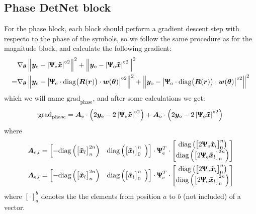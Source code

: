 \subsection{Phase DetNet block}

For the phase block, each block should perform a gradient descent step with respecto to the phase of the symbols, so we follow the same procedure as for the magnitude block, and calculate the following gradient:
 \begin{align}
	&\nabla_{\bm \theta}\left\lVert \bm y_\text{e} - \left|\bm{\Uppsi_\text{e}\tilde{x} } \right|^{\circ2}\right\rVert^2+\left\lVert \bm y_\text{o} - \left|\bm{\Uppsi_\text{o}\tilde{x} } \right|^{\circ2}\right\rVert^2\\
	=&\nabla_{\bm \theta}\left\lVert \bm y_\text{e} - \left|\bm{\Uppsi}_\text{e}\cdot\text{diag}\bigl(\bm R(\bm r)\bigr)\cdot\bm w(\bm \theta)  \right|^{\circ2}\right\rVert^2+\left\lVert \bm y_\text{o} - \left|\bm{\Uppsi}_\text{o}\cdot\text{diag}\bigl(\bm R(\bm r)\bigr)\cdot\bm w(\bm \theta)  \right|^{\circ2}\right\rVert^2
\end{align}
which we will name $\text{grad}_\text{phase}$, and after some calculations we get:
\begin{equation}
\text{grad}_\text{phase}=\bm A_\text{e}\cdot\left(2\bm y_\text{e} - 2\left|\bm{\Uppsi}_\text{e}\bm{\tilde{x}}\right|^{\circ2}\right)+
\bm A_\text{o}\cdot\left(2\bm y_\text{o} - 2\left|\bm{\Uppsi}_\text{o}\bm{\tilde{x}}\right|^{\circ2}\right)
\label{eq:grad_phase}
\end{equation}
where
\begin{align}
\bm A_{\text{e},l}&=\begin{bmatrix}-\text{diag}\left(\bigl[\bm{\tilde{x}}_l\bigr]_{n}^{2n}\right)&\text{diag}\left(\bigl[\bm{\tilde{x}}_l\bigr]_0^{n\phantom{1}}\right)\end{bmatrix}\cdot\bm{\Uppsi}_\text{e}^T\cdot\begin{bmatrix}\text{diag}\left(\bigl[2\bm{\Uppsi}_\text{e}\bm{\tilde{x}}_l\bigr]_0^n\right)\\\text{diag}\left(\bigl[2\bm{\Uppsi}_\text{e}\bm{\tilde{x}}_l\bigr]_{n}^{2n}\right)\end{bmatrix}\\
\bm A_{\text{e},l}&=\begin{bmatrix}-\text{diag}\left(\bigl[\bm{\tilde{x}}_l\bigr]_{n}^{2n}\right)&\text{diag}\left(\bigl[\bm{\tilde{x}}_l\bigr]_0^{n\phantom{1}}\right)\end{bmatrix}\cdot\bm{\Uppsi}_\text{e}^T\cdot\begin{bmatrix}\text{diag}\left(\bigl[2\bm{\Uppsi}_\text{e}\bm{\tilde{x}}_l\bigr]_0^n\right)\\\text{diag}\left(\bigl[2\bm{\Uppsi}_\text{e}\bm{\tilde{x}}_l\bigr]_{n}^{2n}\right)\end{bmatrix}
\end{align}
where $[\cdot]_a^b$ denotes the the elements from position $a$ to $b$ (not included) of a vector.\\

